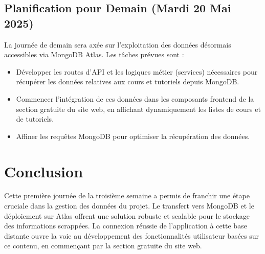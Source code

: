 \documentclass[12pt, a4paper]{article}
\begin{document}
\subsection{Planification pour Demain (Mardi 20 Mai 2025)}
La journée de demain sera axée sur l'exploitation des données désormais accessibles via MongoDB Atlas. Les tâches prévues sont :
\begin{itemize}
  \item Développer les routes d'API et les logiques métier (services) nécessaires pour récupérer les données relatives aux cours et tutoriels depuis MongoDB.
  \item Commencer l'intégration de ces données dans les composants frontend de la section gratuite du site web, en affichant dynamiquement les listes de cours et de tutoriels.
  \item Affiner les requêtes MongoDB pour optimiser la récupération des données.
\end{itemize}

\section{Conclusion}
Cette première journée de la troisième semaine a permis de franchir une étape cruciale dans la gestion des données du projet. Le transfert vers MongoDB et le déploiement sur Atlas offrent une solution robuste et scalable pour le stockage des informations scrappées. La connexion réussie de l'application à cette base distante ouvre la voie au développement des fonctionnalités utilisateur basées sur ce contenu, en commençant par la section gratuite du site web.
\end{document}
